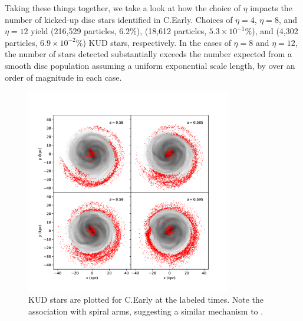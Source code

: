 Taking these things together, we take a look at how the choice of $\eta$ impacts the number of kicked-up disc stars identified in C.Early. Choices of $\eta=4$, $\eta=8$, and $\eta=12$ yield (216,529 particles, $6.2\%$), (18,612 particles, $5.3 \times 10^{-1}\%$), and (4,302 particles, $6.9 \times 10^{-2}\%$) KUD stars, respectively. In the cases of $\eta=8$ and $\eta=12$, the number of stars detected substantially exceeds the number expected from a smooth disc population assuming a uniform exponential scale length, by over an order of magnitude in each case. 
\begin{figure}
    \centering
	\includegraphics[width=0.8\textwidth]{../figures/fiducial_halo_268824_xy_s_016.pdf}
	\caption{KUD stars are plotted for C.Early at the labeled times. Note the association with spiral arms, suggesting a similar mechanism to \citet{laporte_2019_feathers}.}
	\label{fig:xy_tidal_tail_halo_c}
\end{figure}

